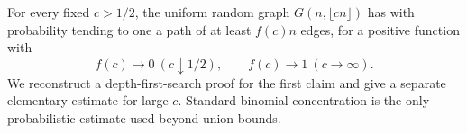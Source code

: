 For every fixed \(c>1/2\), the uniform random graph
\(G(n,\lfloor cn\rfloor)\) has with probability tending to one
a path of at least \(f(c)n\) edges, for a positive function with
\[
 f(c)\longrightarrow0\ (c\downarrow1/2),\qquad
 f(c)\longrightarrow1\ (c\to\infty).
\]
We reconstruct a depth-first-search proof for the first
claim and give a separate elementary estimate for large \(c\).
Standard binomial concentration is the only probabilistic
estimate used beyond union bounds.
